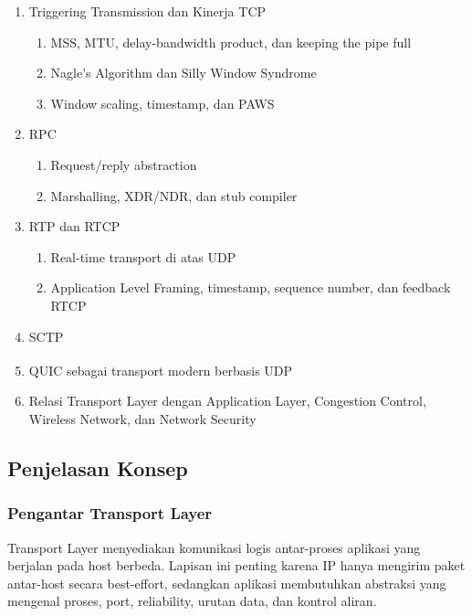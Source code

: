\begin{enumerate}
\begin{enumerate}
    \end{enumerate}
    \item \ppaham Triggering Transmission dan Kinerja TCP
    \begin{enumerate}
        \item \pwajib MSS, MTU, delay-bandwidth product, dan keeping the pipe full
        \item \ppaham Nagle's Algorithm dan Silly Window Syndrome
        \item \ppaham Window scaling, timestamp, dan PAWS
    \end{enumerate}
    \item \ppaham RPC
    \begin{enumerate}
        \item \ppaham Request/reply abstraction
        \item \ppaham Marshalling, XDR/NDR, dan stub compiler
    \end{enumerate}
    \item \ppaham RTP dan RTCP
    \begin{enumerate}
        \item \ppaham Real-time transport di atas UDP
        \item \ppaham Application Level Framing, timestamp, sequence number, dan feedback RTCP
    \end{enumerate}
    \item \ppaham SCTP
    \item \ppaham QUIC sebagai transport modern berbasis UDP\textsuperscript{\dag}
    \item \pwajib Relasi Transport Layer dengan Application Layer, Congestion Control, Wireless Network, dan Network Security
\end{enumerate}

\subsection{Penjelasan Konsep}

\subsubsection{Pengantar Transport Layer}
\begin{jawab}
Transport Layer menyediakan komunikasi logis antar-proses aplikasi yang berjalan pada host berbeda. Lapisan ini penting karena IP hanya mengirim paket antar-host secara best-effort, sedangkan aplikasi membutuhkan abstraksi yang mengenal proses, port, reliability, urutan data, dan kontrol aliran.
\end{jawab}

